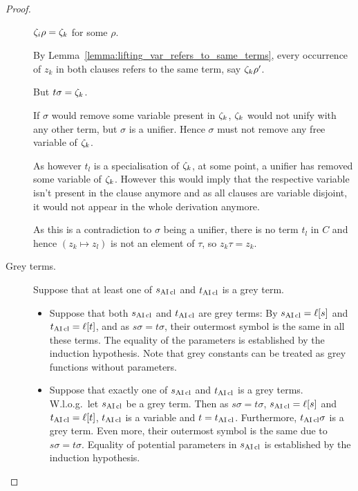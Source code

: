 \documentclass[,%
	paper=a4,%
	DIV12, %
	twoside=false,%
	liststotoc,
	bibtotoc,
	draft=false,%
	numbers=noendperiod
]{scrartcl}
\begin{document}
\begin{proof}
\begin{description}
\begin{compactitem}
{				$\zeta_{i} \rho = \zeta_{k}$ for some $\rho$.

				By Lemma~\ref{lemma:lifting_var_refers_to_same_terms}, every occurrence of $z_k$ in both clauses refers to the same term, say $\zeta_{k}\rho'$.


				But $t\sigma = \zeta_{k}$. 

				If $\sigma$ would remove some variable present in $\zeta_{k}$, $\zeta_{k}$ would not unify with any other term, but $\sigma$ is a unifier. Hence $\sigma$ must not remove any free variable of $\zeta_{k}$.

				As however $t_l$ is a specialisation of $\zeta_{k}$, at some point, a unifier has removed some variable of $\zeta_{k}$. However this would imply that the respective variable isn't present in the clause anymore and as all clauses are variable disjoint, it would not appear in the whole derivation anymore.

				As this is a contradiction to $\sigma$ being a unifier, there is no term $t_l$ in $C$ and hence $(z_k \mapsto z_l)$ is not an element of $\tau$, so $z_k\tau = z_k$.
			}

				\cbend
			\end{compactitem}

		\item[Grey terms.]
			Suppose that at least one of $s_{\operatorname{AI}\mathrm{cl}}$ and $t_{\operatorname{AI}\mathrm{cl}}$ is a grey term.
			\begin{itemize}
				\item
					Suppose that both $s_{\operatorname{AI}\mathrm{cl}}$ and $t_{\operatorname{AI}\mathrm{cl}}$ are grey terms:
					By $s_{\operatorname{AI}\mathrm{cl}} = \ell[s]$ and 
					$t_{\operatorname{AI}\mathrm{cl}} = \ell[t]$, and as $s\sigma = t\sigma$, their outermost symbol is the same in all these terms.
					The equality of the parameters is established by the induction hypothesis.
					Note that grey constants can be treated as grey functions without parameters.

				\item
					Suppose that exactly one of $s_{\operatorname{AI}\mathrm{cl}}$ and $t_{\operatorname{AI}\mathrm{cl}}$ is a grey terms. W.l.o.g.~let $s_{\operatorname{AI}\mathrm{cl}}$ be a grey term. Then as $s\sigma=t\sigma$, $s_{\operatorname{AI}\mathrm{cl}} = \ell[s]$ and $t_{\operatorname{AI}\mathrm{cl}} = \ell[t]$, $t_{\operatorname{AI}\mathrm{cl}}$ is a variable and $t=t_{\operatorname{AI}\mathrm{cl}}$.
					Furthermore, $t_{\operatorname{AI}\mathrm{cl}}\sigma$ is a grey term. 
					Even more, their outermost symbol is the same due to $s\sigma = t\sigma$.
					Equality of potential parameters in $s_{\operatorname{AI}\mathrm{cl}}$ is established by the induction hypothesis.
			\end{itemize}



\end{description}
\end{proof}
\end{document}
